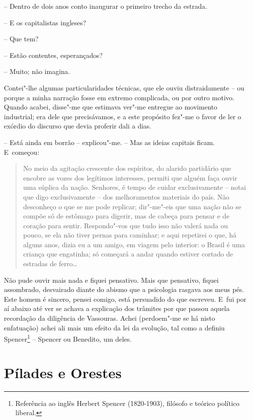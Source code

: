 -- Dentro de dois anos conto inaugurar o primeiro trecho da estrada.

-- E os capitalistas ingleses?

-- Que tem?

-- Estão contentes, esperançados?

-- Muito; não imagina.

Contei"-lhe algumas particularidades técnicas, que ele ouviu
distraidamente -- ou porque a minha narração fosse em extremo
complicada, ou por outro motivo. Quando acabei, disse"-me que estimava
ver"-me entregue ao movimento industrial; era dele que precisávamos, e a
este propósito fez"-me o favor de ler o exórdio do discurso que devia
proferir dali a dias.

-- Está ainda em borrão -- explicou"-me. -- Mas as ideias capitais ficam.
E~começou:

\smallskip

\begin{quote}
No meio da agitação crescente dos espíritos, do alarido partidário que
encobre as vozes dos legítimos interesses, permiti que alguém faça ouvir
uma súplica da nação. Senhores, é tempo de cuidar exclusivamente --
notai que digo exclusivamente -- dos melhoramentos materiais do país.
Não desconheço o que se me pode replicar; dir"-me"-eis que uma nação não
se compõe só de estômago para digerir, mas de cabeça para pensar e de
coração para sentir. Respondo"-vos que tudo isso não valerá nada ou
pouco, se ela não tiver pernas para caminhar; e aqui repetirei o que, há
alguns anos, dizia eu a um amigo, em viagem pelo interior: o Brasil é
uma criança que engatinha; só começará a andar quando estiver cortado de
estradas de ferro\ldots{}
\end{quote}

\smallskip

Não pude ouvir mais nada e fiquei pensativo. Mais que pensativo, fiquei
assombrado, desvairado diante do abismo que a psicologia rasgava aos
meus pés. Este homem é sincero, pensei comigo, está persuadido do que
escreveu. E~fui por aí abaixo até ver se achava a explicação dos
trâmites por que passou aquela recordação da diligência de Vassouras.
Achei (perdoem"-me se há nisto enfatuação) achei ali mais um efeito da
lei da evolução, tal como a definiu Spencer\footnote{Referência ao
  inglês Herbert Spencer (1820-1903), filósofo e teórico político
  liberal.} -- Spencer ou Benedito, um deles.

\chapter{Pílades e Orestes}

